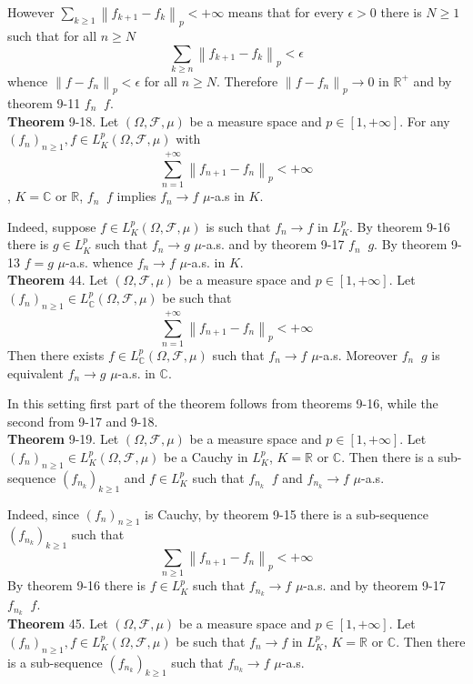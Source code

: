 \documentclass[a4paper]{article}
\newcommand{\clo}[1]{\left [ #1 \right ]}
\newcommand{\brac}[1]{\left ( #1 \right )}
\newcommand{\nrm}[1]{\left\| #1 \right \|}
\newcommand{\Real}{\mathbb{R}}
\newcommand{\Cplx}{\mathbb{C}}
\newcommand{\Fcal}{\mathcal{F}}
\newcommand{\lpto}{\mathop{\overset{L^p}{\to}}\nolimits}
\begin{document}
However $\sum_{k\geq 1} \nrm{f_{k+1}-f_k}_p<+\infty$ means that for every $\epsilon>0$ there is $N\geq 1$ such that for all $n\geq N$ \[\sum_{k\geq n} \nrm{f_{k+1}-f_k}_p < \epsilon\] whence $\nrm{f-f_n}_p<\epsilon$ for all $n\geq N$. Therefore $\nrm{f-f_n}_p\to 0$ in $\Real^+$ and by theorem 9-11 $f_n\lpto f$.\\

\label{thm:lpto_muas} \noindent \textbf{Theorem} 9-18.
Let $\brac{\Omega, \Fcal, \mu}$ be a measure space and $p\in \clo{1,+\infty}$. For any $\brac{f_n}_{n\geq 1}, f\in L^p_K\brac{\Omega, \Fcal, \mu}$ with \[\sum_{n=1}^{+\infty} \nrm{f_{n+1}-f_n}_p < +\infty\], $K=\Cplx$ or $\Real$, $f_n\lpto f$ implies $f_n\to f$ $\mu$-a.s in $K$.

Indeed, suppose $f\in L^p_K\brac{\Omega, \Fcal, \mu}$ is such that $f_n\to f$ in $L^p_K$. By theorem 9-16 there is $g\in L^p_K$ such that $f_n\to g$ $\mu$-a.s. and by theorem 9-17 $f_n\lpto g$. By theorem 9-13 $f=g$ $\mu$-a.s. whence $f_n\to f$ $\mu$-a.s. in $K$.\\

\label{thm:sum_lp_muas_conv} \noindent \textbf{Theorem} 44.
Let $\brac{\Omega, \Fcal, \mu}$ be a measure space and $p\in \clo{1,+\infty}$. Let $\brac{f_n}_{n\geq 1}\in L^p_\Cplx\brac{\Omega, \Fcal, \mu}$ be such that \[\sum_{n=1}^{+\infty} \nrm{f_{n+1}-f_n}_p < +\infty\] Then there exists $f\in L^p_\Cplx\brac{\Omega, \Fcal, \mu}$ such that $f_n\to f$ $\mu$-a.s. Moreover $f_n\lpto g$ is equivalent $f_n\to g$ $\mu$-a.s. in $\Cplx$.

In this setting first part of the theorem follows from theorems 9-16, while the second from 9-17 and 9-18.\\

\label{thm:cauchy_conv_subseq} \noindent \textbf{Theorem} 9-19.
Let $\brac{\Omega, \Fcal, \mu}$ be a measure space and $p\in \clo{1,+\infty}$. Let $\brac{f_n}_{n\geq 1}\in L^p_K\brac{\Omega, \Fcal, \mu}$ be a Cauchy in $L^p_K$, $K=\Real$ or $\Cplx$. Then there is a sub-sequence $\brac{f_{n_k}}_{k\geq 1}$ and $f\in L^p_K$ such that $f_{n_k}\lpto f$ and $f_{n_k}\to f$ $\mu$-a.s.

Indeed, since $\brac{f_n}_{n\geq 1}$ is Cauchy, by theorem 9-15 there is a sub-sequence $\brac{f_{n_k}}_{k\geq 1}$ such that \[\sum_{n\geq 1} \nrm{f_{n+1}-f_n}_p < +\infty\] By theorem 9-16 there is $f\in L^p_K$ such that $f_{n_k}\to f$ $\mu$-a.s. and by theorem 9-17 $f_{n_k}\lpto f$.\\

\label{thm:lp_conv_subseq} \noindent \textbf{Theorem} 45.
Let $\brac{\Omega, \Fcal, \mu}$ be a measure space and $p\in \clo{1,+\infty}$. Let $\brac{f_n}_{n\geq 1}, f\in L^p_K\brac{\Omega, \Fcal, \mu}$ be such that $f_n\to f$ in $L^p_K$, $K=\Real$ or $\Cplx$. Then there is a sub-sequence $\brac{f_{n_k}}_{k\geq 1}$ such that $f_{n_k}\to f$ $\mu$-a.s.
\end{document}

